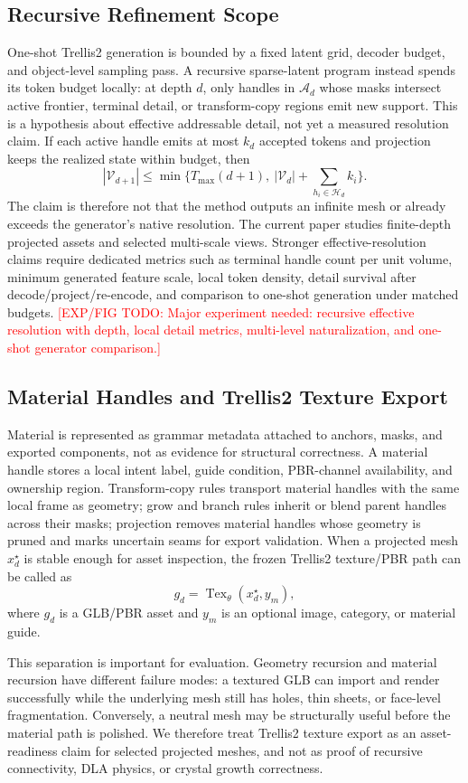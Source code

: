 \documentclass[sigconf,anonymous,review]{acmart}
\providecommand{\ExpFigTODO}[1]{\textcolor{red}{[EXP/FIG TODO: #1]}}
\begin{document}
\subsection{Recursive Refinement Scope}
One-shot Trellis2 generation is bounded by a fixed latent grid, decoder budget, and object-level sampling pass. A recursive sparse-latent program instead spends its token budget locally: at depth $d$, only handles in $\mathcal A_d$ whose masks intersect active frontier, terminal detail, or transform-copy regions emit new support. This is a hypothesis about effective addressable detail, not yet a measured resolution claim. If each active handle emits at most $k_d$ accepted tokens and projection keeps the realized state within budget, then
\[
|\mathcal V_{d+1}|
\leq
\min\{T_{\max}(d+1),\ |\mathcal V_d|+\sum_{h_i\in\mathcal H_d}k_i\}.
\]
The claim is therefore not that the method outputs an infinite mesh or already exceeds the generator's native resolution. The current paper studies finite-depth projected assets and selected multi-scale views. Stronger effective-resolution claims require dedicated metrics such as terminal handle count per unit volume, minimum generated feature scale, local token density, detail survival after decode/project/re-encode, and comparison to one-shot generation under matched budgets. \ExpFigTODO{Major experiment needed: recursive effective resolution with depth, local detail metrics, multi-level naturalization, and one-shot generator comparison.}

\subsection{Material Handles and Trellis2 Texture Export}
Material is represented as grammar metadata attached to anchors, masks, and exported components, not as evidence for structural correctness. A material handle stores a local intent label, guide condition, PBR-channel availability, and ownership region. Transform-copy rules transport material handles with the same local frame as geometry; grow and branch rules inherit or blend parent handles across their masks; projection removes material handles whose geometry is pruned and marks uncertain seams for export validation. When a projected mesh $x_d^\star$ is stable enough for asset inspection, the frozen Trellis2 texture/PBR path can be called as
\[
g_d=\operatorname{Tex}_{\theta}(x_d^\star,y_m),
\]
where $g_d$ is a GLB/PBR asset and $y_m$ is an optional image, category, or material guide.

This separation is important for evaluation. Geometry recursion and material recursion have different failure modes: a textured GLB can import and render successfully while the underlying mesh still has holes, thin sheets, or face-level fragmentation. Conversely, a neutral mesh may be structurally useful before the material path is polished. We therefore treat Trellis2 texture export as an asset-readiness claim for selected projected meshes, and not as proof of recursive connectivity, DLA physics, or crystal growth correctness.
\end{document}
